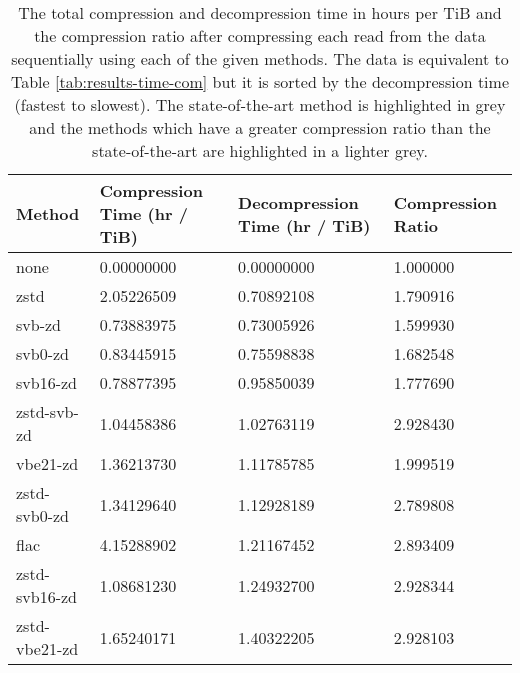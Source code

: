\begin{table}
	\caption[The total compression and
	decompression time in hours per TiB and the compression ratio after
	compressing each read from the data sequentially using each of the given
	methods. It is sorted by the decompression time (fastest to slowest).]{\label{tab:results-time-dec} The total compression and
	decompression time in hours per TiB and the compression ratio after
	compressing each read from the data sequentially using each of the given
	methods. The data is equivalent to Table \ref{tab:results-time-com} but
	it is sorted by the decompression time (fastest to slowest). The state-of-the-art method is
	highlighted in grey and the methods which have a greater compression
	ratio than the state-of-the-art are highlighted in a lighter grey.}
	\begin{tabular}{|l|l|l|l|}
	    \hline
	    Method & Compression Time (hr / TiB) & Decompression Time (hr / TiB) & Compression Ratio \\
\hline
		none    & 0.00000000      & 0.00000000    &1.000000\\
               zstd     & 2.05226509      & 0.70892108    &1.790916\\
             svb-zd     & 0.73883975      & 0.73005926    &1.599930\\
            svb0-zd     & 0.83445915      & 0.75598838    &1.682548\\
           svb16-zd     & 0.78877395      & 0.95850039    &1.777690\\
		\rowcolor{gray}
        zstd-svb-zd     & 1.04458386      & 1.02763119    &2.928430\\
           vbe21-zd     & 1.36213730      & 1.11785785    &1.999519\\
       zstd-svb0-zd     & 1.34129640      & 1.12928189    &2.789808\\
               flac     & 4.15288902      & 1.21167452    &2.893409\\
      zstd-svb16-zd     & 1.08681230      & 1.24932700    &2.928344\\
      zstd-vbe21-zd     & 1.65240171      & 1.40322205    &2.928103\\

\end{tabular}
\end{table}
